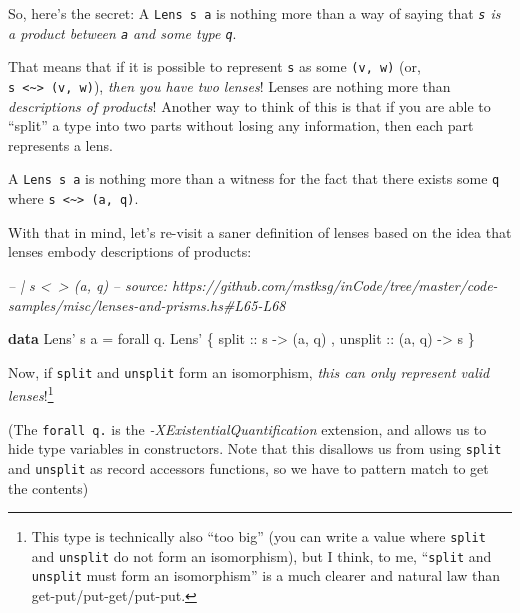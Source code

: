 \documentclass[]{article}
\newenvironment{Shaded}{}{}
\newcommand{\CommentTok}[1]{\textcolor[rgb]{0.38,0.63,0.69}{\textit{#1}}}
\newcommand{\DataTypeTok}[1]{\textcolor[rgb]{0.56,0.13,0.00}{#1}}
\newcommand{\FunctionTok}[1]{\textcolor[rgb]{0.02,0.16,0.49}{#1}}
\newcommand{\KeywordTok}[1]{\textcolor[rgb]{0.00,0.44,0.13}{\textbf{#1}}}
\newcommand{\NormalTok}[1]{#1}
\newcommand{\OtherTok}[1]{\textcolor[rgb]{0.00,0.44,0.13}{#1}}
\begin{document}
So, here's the secret: A \texttt{Lens\textquotesingle{}\ s\ a} is nothing more
than a way of saying that \emph{\texttt{s} is a product between \texttt{a} and
some type \texttt{q}}.

That means that if it is possible to represent \texttt{s} as some
\texttt{(v,\ w)} (or,
\texttt{s\ \textless{}\textasciitilde{}\textgreater{}\ (v,\ w)}), \emph{then you
have two lenses}! Lenses are nothing more than \emph{descriptions of products}!
Another way to think of this is that if you are able to ``split'' a type into
two parts without losing any information, then each part represents a lens.

A \texttt{Lens\textquotesingle{}\ s\ a} is nothing more than a witness for the
fact that there exists some \texttt{q} where
\texttt{s\ \textless{}\textasciitilde{}\textgreater{}\ (a,\ q)}.

With that in mind, let's re-visit a saner definition of lenses based on the idea
that lenses embody descriptions of products:

\begin{Shaded}
\begin{Highlighting}[]
\CommentTok{-- | s <~> (a, q)}
\CommentTok{-- source: https://github.com/mstksg/inCode/tree/master/code-samples/misc/lenses-and-prisms.hs#L65-L68}

\KeywordTok{data} \DataTypeTok{Lens'}\NormalTok{ s a }\FunctionTok{=}\NormalTok{ forall q}\FunctionTok{.} \DataTypeTok{Lens'}
\NormalTok{    \{}\OtherTok{ split   ::}\NormalTok{ s }\OtherTok{->}\NormalTok{ (a, q)}
\NormalTok{    ,}\OtherTok{ unsplit ::}\NormalTok{ (a, q) }\OtherTok{->}\NormalTok{ s}
\NormalTok{    \}}
\end{Highlighting}
\end{Shaded}

Now, if \texttt{split} and \texttt{unsplit} form an isomorphism, \emph{this can
only represent valid lenses}!\footnote{This type is technically also ``too big''
  (you can write a value where \texttt{split} and \texttt{unsplit} do not form
  an isomorphism), but I think, to me, ``\texttt{split} and \texttt{unsplit}
  must form an isomorphism'' is a much clearer and natural law than
  get-put/put-get/put-put.}

(The \texttt{forall\ q.} is the \emph{-XExistentialQuantification} extension,
and allows us to hide type variables in constructors. Note that this disallows
us from using \texttt{split} and \texttt{unsplit} as record accessors functions,
so we have to pattern match to get the contents)
\end{document}

